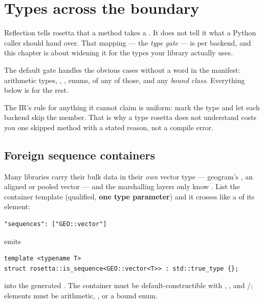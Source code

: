 \chapter{Types across the boundary}
\label{ch:types}

Reflection tells rosetta that a method takes a . It
does not tell it what a Python caller should hand over. That mapping --- the
\emph{type gate} --- is per backend, and this chapter is about widening it for
the types your library actually uses.

The default gate handles the obvious cases without a word in the manifest:
arithmetic types, , , enums, 
of any of those, and any \emph{bound class}. Everything below is for the rest.

\begin{note}
The IR's rule for anything it cannot claim is uniform: mark the type
 and let each backend skip the member. That is why a
type rosetta does not understand costs you one skipped method with a stated
reason, not a compile error.
\end{note}

\section{Foreign sequence containers}
\label{sec:sequences}

Many libraries carry their bulk data in their \emph{own} vector type ---
geogram's , an aligned or pooled vector --- and the
marshalling layers only know . List the container template
(qualified, \textbf{one type parameter}) and it crosses like a
 of its element:

\begin{lstlisting}[style=json]
"sequences": ["GEO::vector"]
\end{lstlisting}

 emits

\begin{lstlisting}[style=cpp]
template <typename T>
struct rosetta::is_sequence<GEO::vector<T>> : std::true_type {};
\end{lstlisting}

into the generated . The container must be
default-constructible with , , 
and /; elements must be arithmetic, ,
 or a bound enum.


